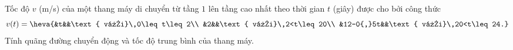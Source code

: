 \begin{bt}%
	Tốc độ $v$ (m/s) của một thang máy di chuyển từ tầng $1$ lên tầng cao nhất theo thời gian $t$ (giây) được cho bởi công thức 
	\[v(t)=\heva{&t&&\text{  với}\,0\leq t\leq 2\\
	 &2&&\text{ với}\,2<t\leq 20\\
	 &12-0{,}5t&&\text{ với}\,20<t\leq 24.}\]
	Tính quãng đường chuyển động và  tốc độ trung bình của thang máy.
\end{bt}

